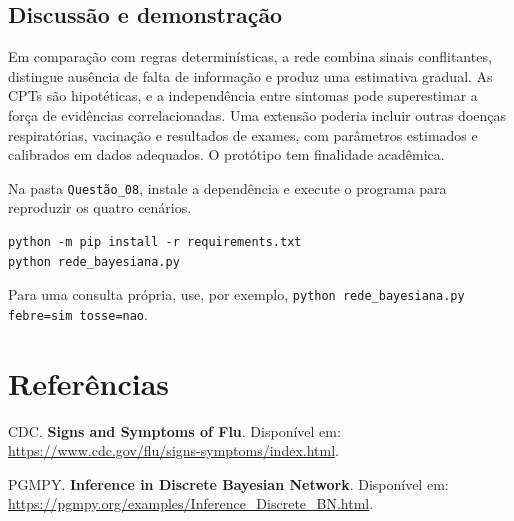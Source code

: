 \documentclass[12pt,a4paper]{article}
\begin{document}
\subsection{Discussão e demonstração}

Em comparação com regras determinísticas, a rede combina sinais conflitantes, distingue ausência de falta de informação e produz uma estimativa gradual. As CPTs são hipotéticas, e a independência entre sintomas pode superestimar a força de evidências correlacionadas. Uma extensão poderia incluir outras doenças respiratórias, vacinação e resultados de exames, com parâmetros estimados e calibrados em dados adequados. O protótipo tem finalidade acadêmica.

Na pasta \texttt{Questão\_08}, instale a dependência e execute o programa para reproduzir os quatro cenários.

\begin{lstlisting}
python -m pip install -r requirements.txt
python rede_bayesiana.py
\end{lstlisting}

Para uma consulta própria, use, por exemplo, \texttt{python rede\_bayesiana.py febre=sim tosse=nao}.

\section*{Referências}

\noindent [1] CDC. \textbf{Signs and Symptoms of Flu}. Disponível em: \url{https://www.cdc.gov/flu/signs-symptoms/index.html}.

\noindent [2] PGMPY. \textbf{Inference in Discrete Bayesian Network}. Disponível em: \url{https://pgmpy.org/examples/Inference_Discrete_BN.html}.
\end{document}
